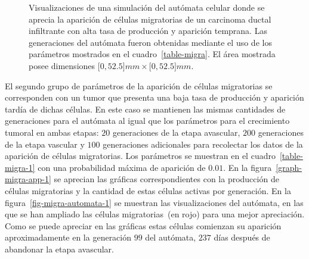 \begin{figure}[p]
\begin{center}
\end{center}\vspace*{-0.6cm}
\caption[Visualizaciones de una simulaci\'on del aut\'omata celular donde se aprecia la aparici\'on de c\'elulas migratorias de un carcinoma ductal infiltrante con alta tasa de producci\'on y aparici\'on temprana]{Visualizaciones de una simulaci\'on del aut\'omata celular donde se aprecia la aparici\'on de c\'elulas migratorias de un carcinoma ductal infiltrante con alta tasa de producci\'on y aparici\'on temprana. Las generaciones del aut\'omata fueron obtenidas mediante el uso de los par\'ametros mostrados en el cuadro~\ref{table-migra}. El \'area mostrada posee dimensiones $[0,52$.$5]mm \times [0,52$.$5]mm$.}
\label{fig-migra-automata}
\end{figure}

El segundo grupo de par\'ametros de la aparici\'on de c\'elulas migratorias se corresponden con un tumor que presenta una baja tasa de producci\'on y aparici\'on tard\'ia de dichas c\'elulas. En este caso se mantienen las mismas cantidades de generaciones para el aut\'omata al igual que los par\'ametros para el crecimiento tumoral en ambas etapas: $20$ generaciones de la etapa avascular, $200$ generaciones de la etapa vascular y $100$ generaciones adicionales para recolectar los datos de la aparici\'on de c\'elulas migratorias. Los par\'ametros se muestran en el cuadro~\ref{table-migra-1} con una probabilidad m\'axima de aparici\'on de $0$.$01$. En la figura~\ref{graph-migra-app-1} se aprecian las gr\'aficas correspondientes con la producci\'on de c\'elulas migratorias y la cantidad de estas c\'elulas activas por generaci\'on. En la figura~\ref{fig-migra-automata-1} se muestran las visualizaciones del aut\'omata, en las que se han ampliado las c\'elulas migratorias~(en rojo) para una mejor apreciaci\'on. Como se puede apreciar en las gr\'aficas estas c\'elulas comienzan su aparici\'on aproximadamente en la generaci\'on $99$ del aut\'omata, $237$ d\'ias despu\'es de abandonar la etapa avascular. 
\begin{table}[!ht]
\begin{center}
\vspace*{-0.6cm}
\end{center}
\caption[Par\'ametros de la regla de la aparici\'on de c\'elulas migratorias de un carcinoma ductal infiltrante con una baja tasa de producci\'on y aparici\'on tard\'ia]{Par\'ametros de la regla de la aparici\'on de c\'elulas migratorias de un carcinoma ductal infiltrante con una baja tasa de producci\'on y aparici\'on tard\'ia.}
\label{table-migra-1}
\end{table}

